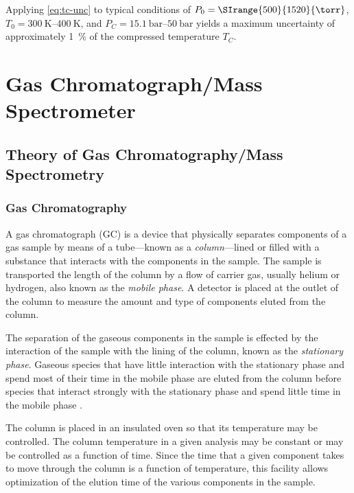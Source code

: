 \documentclass[../main.tex]{subfiles}
\begin{document}
Applying \cref{eq:tc-unc} to typical conditions of $P_0 = \SIrange{500}{1520}{\torr}$,
$T_0=\SIrange{300}{400}{\kelvin}$, and $P_C=\SIrange{15.1}{50}{\bar}$ yields
a maximum uncertainty of approximately \SI{1}{\percent} of the
compressed temperature $T_C$.

\section{Gas Chromatograph/Mass Spectrometer}
\label{sec:gcms}

\subsection{Theory of Gas Chromatography/Mass Spectrometry}
\label{sec:gcms-theory}

\subsubsection{Gas Chromatography}

A gas chromatograph (GC) is a device that physically separates components
of a gas sample by means of a tube---known as a \textit{column}---lined or filled
with a substance that interacts with the components in the sample. The sample
is transported the length of the column by a flow of carrier gas, usually
helium or hydrogen, also known as the \textit{mobile phase}. A detector is
placed at the outlet of the column to measure the amount and type
of components eluted from the column.

The separation of the gaseous components in the sample is effected by
the interaction of the sample with the lining of the column, known as the
\textit{stationary phase}. Gaseous species that have little interaction with
the stationary phase and spend most of their time in the mobile phase
are eluted from the column before species that interact strongly with
the stationary phase and spend little time in the mobile phase \cite{Sparkman2011a}.

The column is placed in an insulated oven so that its temperature may be
controlled. The column temperature in a given analysis may be constant
or may be controlled as a function of time. Since the time that a given
component takes to move through the column is a function of temperature,
this facility allows optimization of the elution time of the various
components in the sample.
\end{document}
